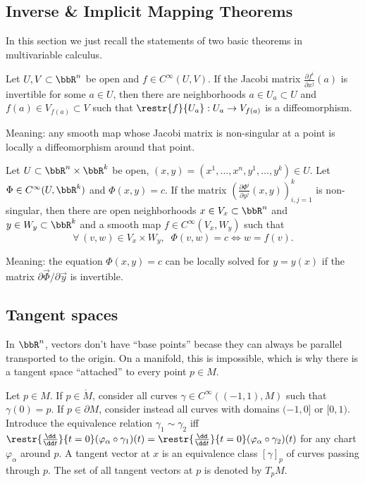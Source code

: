 \subsection{Inverse \& Implicit Mapping Theorems}

In this section we just recall the statements of two basic theorems in multivariable calculus.
\begin{thm}\label{InMT}
    Let $U,V\subset\bbR^n$ be open and $f\in C^\infty(U,V)$. If the Jacobi matrix $\frac{\partial f^i}{\partial x^j} (a)$ is invertible for some $a\in U$, then there are neighborhoods $a\in U_a\subset U$ and $f(a)\in V_{f(a)}\subset V$ such that $\restr{f}{U_a}:U_a\to V_{f(a)}$ is a diffeomorphism.
\end{thm}
Meaning: any smooth map whose Jacobi matrix is non-singular at a point is locally a diffeomorphism around that point.

\begin{thm}\label{ImMT}
    Let $U\subset \bbR^n\times \bbR^k$ be open, $(x,y)=(x^1,\ldots,x^n,y^1,\ldots,y^k)\in U$. Let $\Phi\in C^\infty(U,\bbR^k)$ and $\Phi(x,y)=c$. If the matrix $\left(\frac{\partial\Phi^i}{\partial y^j}(x,y)\right)_{i,j=1}^k$  is non-singular, then there are open neighborhoods $x\in V_x\subset \bbR^n$ and $y\in W_y\subset\bbR^k$ and a smooth map $f\in C^\infty (V_x,W_y)$ such that 
\[\forall\,(v,w)\in V_x\times W_y,\;\; \Phi (v,w)=c \Leftrightarrow w=f(v).\]
\end{thm}
Meaning: the equation $\Phi(x,y)=c$ can be locally solved for $y=y(x)$ if the matrix $\partial\Vec{\Phi}/\partial\Vec{y}$ is invertible.

\subsection{Tangent spaces}
    In $\bbR^n$, vectors don't have ``base points'' becase they can always be parallel transported to the origin. On a manifold, this is impossible, which is why there is a tangent space ``attached'' to every point $p\in M$. 
\begin{defn}
    Let $p\in M$. If $p\in \mathring M$, consider all curves $\gamma\in C^\infty((-1,1),M)$ such that $\gamma(0)=p$. If $p\in \partial M$, consider instead all curves with domains $(-1,0]$ or $[0,1)$. Introduce the equivalence relation $\gamma_1\sim \gamma_2$  iff $\restr{\frac{\dd}{\dd t}}{t=0}(\varphi_\alpha\circ \gamma_1)(t)=\restr{\frac{\dd}{\dd t}}{t=0}(\varphi_\alpha\circ \gamma_2)(t)$ for any chart $\varphi_\alpha$ around $p$. A tangent vector at $x$ is an equivalence class $[\gamma]_p$ of curves passing through $p$. The set of all tangent vectors at $p$ is denoted by $T_p M$.
\end{defn}

